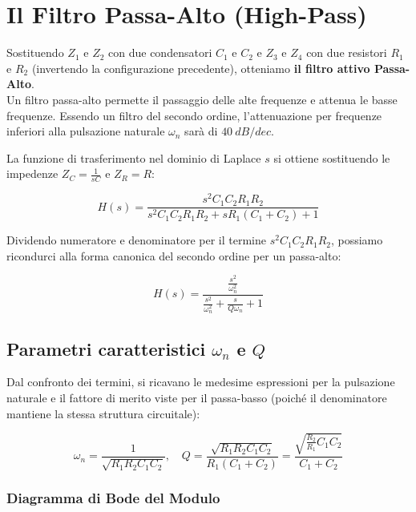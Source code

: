 \chapter{Il Filtro Passa-Alto (High-Pass)}


\SallenKeyHP

Sostituendo $Z_1$ e $Z_2$ con due condensatori $C_1$ e $C_2$ e $Z_3$ e $Z_4$ con due resistori $R_1$ e $R_2$ (invertendo la configurazione precedente), otteniamo \textbf{il filtro attivo Passa-Alto}. \\
Un filtro passa-alto permette il passaggio delle alte frequenze e attenua le basse frequenze. Essendo un filtro del secondo ordine, l'attenuazione per frequenze inferiori alla pulsazione naturale $\omega_n$ sarà di $\SI{40}{dB/dec}$.

La funzione di trasferimento nel dominio di Laplace $s$ si ottiene sostituendo le impedenze $Z_C = \frac{1}{sC}$ e $Z_R = R$:

\begin{equation}
        H(s) = \frac{s^2 C_1 C_2 R_1 R_2}{s^2 C_1 C_2 R_1 R_2 + s R_1 (C_1 + C_2) + 1}
\end{equation}

Dividendo numeratore e denominatore per il termine $s^2 C_1 C_2 R_1 R_2$, possiamo ricondurci alla forma canonica del secondo ordine per un passa-alto:

\begin{equation}
    H(s) = \frac{\frac{s^2}{\omega_n^2}}{\frac{s^2}{\omega_n^2} + \frac{s}{Q\omega_n} + 1}
\end{equation}

\section{Parametri caratteristici \texorpdfstring{$\omega_n$}{ωₙ} e \texorpdfstring{$Q$}{Q}}

Dal confronto dei termini, si ricavano le medesime espressioni per la pulsazione naturale e il fattore di merito viste per il passa-basso (poiché il denominatore mantiene la stessa struttura circuitale):

\begin{equation}
    \omega_n = \frac{1}{\sqrt{R_1 R_2 C_1 C_2}}, \quad Q = \frac{\sqrt{R_1 R_2 C_1 C_2}}{R_1 (C_1 + C_2)} = \frac{\sqrt{\frac{R_2}{R_1} C_1 C_2}}{C_1 + C_2}
\end{equation}

\subsection{Diagramma di Bode del Modulo}




